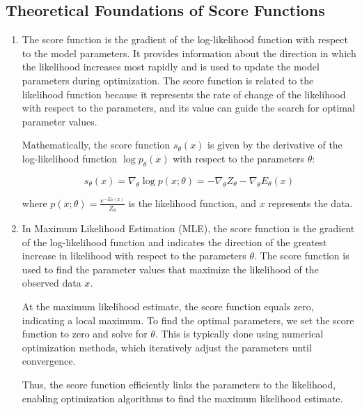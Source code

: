 \documentclass{article}
\begin{document}
\subsection{Theoretical Foundations of Score Functions}
\begin{enumerate}
\item
The score function is the gradient of the log-likelihood function with respect to the model parameters. It provides information about the direction in which the likelihood increases most rapidly and is used to update the model parameters during optimization. The score function is related to the likelihood function because it represents the rate of change of the likelihood with respect to the parameters, and its value can guide the search for optimal parameter values.

Mathematically, the score function \( s_\theta(x) \) is given by the derivative of the log-likelihood function \( \log p_\theta(x) \) with respect to the parameters \( \theta \):

\[
s_\theta(x) = \nabla_\theta \log p(x; \theta)= -\nabla_\theta Z_\theta - \nabla_\theta E_\theta(x) 
\]

where \( p(x; \theta) = \frac{e^{-E_\theta(x)}}{Z_\theta} \) is the likelihood function, and \( x \) represents the data. 
\item 
In Maximum Likelihood Estimation (MLE), the score function is the gradient of the log-likelihood function and indicates the direction of the greatest increase in likelihood with respect to the parameters 
$\theta$.
The score function is used to find the parameter values that maximize the likelihood of the observed data $x$.

At the maximum likelihood estimate, the score function equals zero, indicating a local maximum. To find the optimal parameters, we set the score function to zero and solve for $\theta$.
This is typically done using numerical optimization methods, which iteratively adjust the parameters until convergence.

Thus, the score function efficiently links the parameters to the likelihood, enabling optimization algorithms to find the maximum likelihood estimate.
\end{enumerate}
\end{document}
